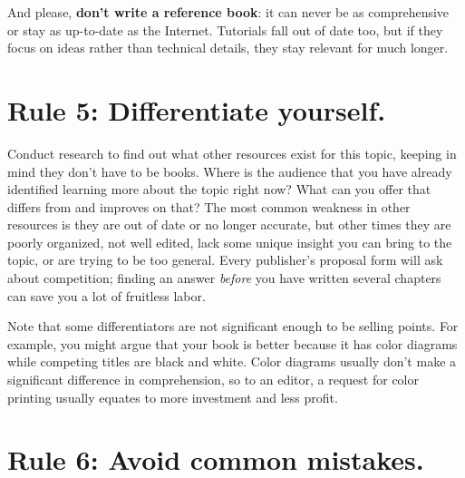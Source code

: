 \documentclass[10pt,letterpaper]{article}
\begin{document}
And please, \textbf{don't write a reference book}: it can never be as
comprehensive or stay as up-to-date as the Internet. Tutorials fall out
of date too, but if they focus on ideas rather than technical details,
they stay relevant for much longer.

\section*{Rule 5: Differentiate yourself.}

Conduct research to find out what other resources exist for this topic,
keeping in mind they don't have to be books. Where is the audience that
you have already identified learning more about the topic right now?
What can you offer that differs from and improves on that? The most
common weakness in other resources is they are out of date or no longer
accurate, but other times they are poorly organized, not well edited,
lack some unique insight you can bring to the topic, or are trying to be
too general. Every publisher's proposal form will ask about competition;
finding an answer \emph{before} you have written several chapters can
save you a lot of fruitless labor.

Note that some differentiators are not significant enough to be selling
points. For example, you might argue that your book is better because it
has color diagrams while competing titles are black and white. Color
diagrams usually don't make a significant difference in comprehension,
so to an editor, a request for color printing usually equates to more
investment and less profit.

\section*{Rule 6: Avoid common mistakes.}
\end{document}
